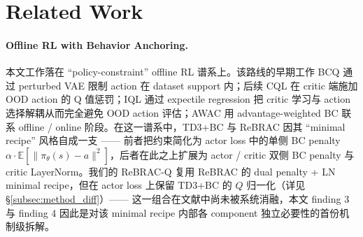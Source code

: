 %
%

\section{Related Work}\label{sec:related_work}

\paragraph{Offline RL with Behavior Anchoring.}
本文工作落在 ``policy-constraint'' offline RL 谱系上。该路线的早期工作 BCQ \citep{fujimoto2019bcq} 通过 perturbed VAE 限制 action 在 dataset support 内；后续 CQL \citep{kumar2020cql} 在 critic 端施加 OOD action 的 Q 值惩罚；IQL \citep{kostrikov2022iql} 通过 expectile regression 把 critic 学习与 action 选择解耦从而完全避免 OOD action 评估；AWAC \citep{nair2020awac} 用 advantage-weighted BC 联系 offline / online 阶段。在这一谱系中，TD3+BC \citep{fujimoto2021td3bc} 与 ReBRAC \citep{tarasov2023rebrac} 因其 ``minimal recipe'' 风格自成一支 —— 前者把约束简化为 actor loss 中的单侧 BC penalty $\alpha \cdot \mathbb{E}[\|\pi_\theta(s) - a\|^2]$，后者在此之上扩展为 actor / critic 双侧 BC penalty 与 critic LayerNorm。我们的 ReBRAC-Q 复用 ReBRAC 的 dual penalty + LN minimal recipe，但在 actor loss 上保留 TD3+BC 的 $Q$ 归一化（详见 \S\ref{subsec:method_diff}）—— 这一组合在文献中尚未被系统消融，本文 finding 3 与 finding 4 因此是对该 minimal recipe 内部各 component 独立必要性的首份机制级拆解。

